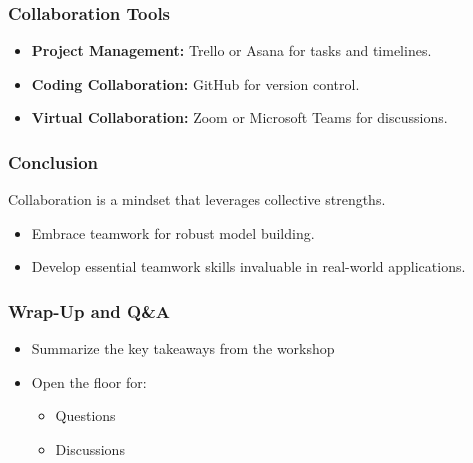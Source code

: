 \documentclass{beamer}
\begin{document}
\begin{frame}[fragile]
    \frametitle{Collaboration Tools}
    \begin{itemize}
        \item \textbf{Project Management:} Trello or Asana for tasks and timelines.
        \item \textbf{Coding Collaboration:} GitHub for version control.
        \item \textbf{Virtual Collaboration:} Zoom or Microsoft Teams for discussions.
    \end{itemize}
\end{frame}

\begin{frame}[fragile]
    \frametitle{Conclusion}
    Collaboration is a mindset that leverages collective strengths. 
    \begin{itemize}
        \item Embrace teamwork for robust model building.
        \item Develop essential teamwork skills invaluable in real-world applications.
    \end{itemize}
\end{frame}

\begin{frame}[fragile]
    \frametitle{Wrap-Up and Q\&A}
    \begin{itemize}
        \item Summarize the key takeaways from the workshop
        \item Open the floor for:
        \begin{itemize}
            \item Questions
            \item Discussions
        \end{itemize}
    \end{itemize}
\end{frame}
\end{document}
